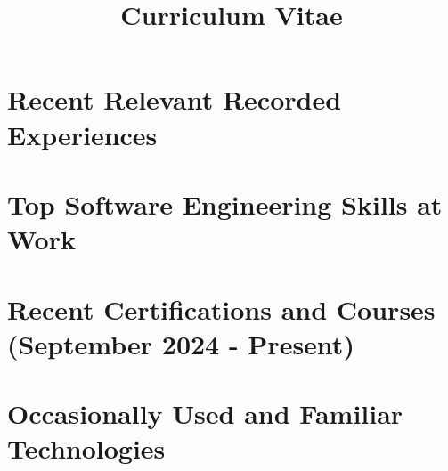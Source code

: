 \documentclass[13.12pt,a4paper,sans,colorlinks,urlcolor=violet, hyperindex,plainpages=false,bookmarksopen,bookmarksnumbered,pdfusetitle]{moderncv}
\title{Curriculum Vitae}
\begin{document}
\hypersetup{urlcolor=violet}

\makecvtitle
\vspace{-3em}



\vspace{-1em}

\section{Recent Relevant Recorded Experiences}


\vspace{0.5em}



\section{Top Software Engineering Skills at \textbf{Work}}


\section{Recent Certifications and Courses (September 2024 - Present)}


\section{Occasionally Used and Familiar Technologies}

\end{document}
